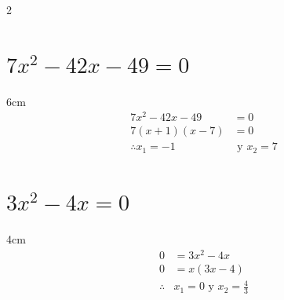 \documentclass[12pt,addpoints,answers]{evalua}
\begin{document}
\begin{questions}
\begin{multicols}{2}
\begin{parts}
            \part {\Large $7x^2-42x-49=0$}

            \begin{solutionbox}{6cm}
                \begin{align*}
                    7x^2-42x-49           & =0                \\
                    7(x +1)(x-7)          & =0                \\
                    \therefore    x_1 =-1 & \text{ y } x_2 =7
                \end{align*}
            \end{solutionbox}


            \part {\Large $3x^2-4x=0$}

            \begin{solutionbox}{4cm}
                \begin{align*}
                    0          & =	      3x^2-4x                    \\
                    0          & =		 x(3x -4)                       \\
                    \therefore & x_1 =0 \text{ y } x_2 =\frac{4}{3}
                \end{align*}
            \end{solutionbox}


\end{parts}
\end{multicols}
\end{questions}
\end{document}

